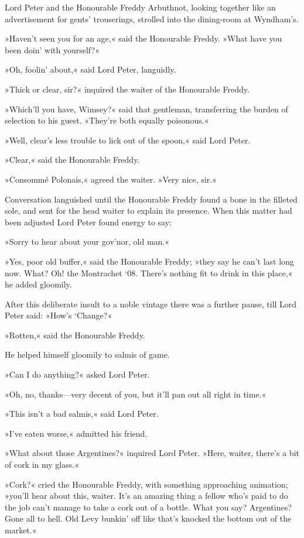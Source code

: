 Lord Peter and the Honourable Freddy Arbuthnot, looking together like an advertisement for gents' trouserings, strolled into the dining-room at Wyndham's.

»Haven't seen you for an age,« said the Honourable Freddy. »What have you been doin' with yourself?«

»Oh, foolin' about,« said Lord Peter, languidly.

»Thick or clear, sir?« inquired the waiter of the Honourable Freddy.

»Which'll you have, Wimsey?« said that gentleman, transferring the burden of selection to his guest. »They're both equally poisonous.«

»Well, clear's less trouble to lick out of the spoon,« said Lord Peter.

»Clear,« said the Honourable Freddy.

»Consommé Polonais,« agreed the waiter. »Very nice, sir.«

Conversation languished until the Honourable Freddy found a bone in the filleted sole, and sent for the head waiter to explain its presence. When this matter had been adjusted Lord Peter found energy to say:

»Sorry to hear about your gov'nor, old man.«

»Yes, poor old buffer,« said the Honourable Freddy; »they say he can't last long now. What? Oh! the Montrachet `08. There's nothing fit to drink in this place,« he added gloomily.

After this deliberate insult to a noble vintage there was a further pause, till Lord Peter said: »How's `Change?«

»Rotten,« said the Honourable Freddy.

He helped himself gloomily to salmis of game.

»Can I do anything?« asked Lord Peter.

»Oh, no, thanks—very decent of you, but it'll pan out all right in time.«

»This isn't a bad salmis,« said Lord Peter.

»I've eaten worse,« admitted his friend.

»What about those Argentines?« inquired Lord Peter. »Here, waiter, there's a bit of cork in my glass.«

»Cork?« cried the Honourable Freddy, with something approaching animation; »you'll hear about this, waiter. It's an amazing thing a fellow who's paid to do the job can't manage to take a cork out of a bottle. What you say? Argentines? Gone all to hell. Old Levy bunkin' off like that's knocked the bottom out of the market.«

